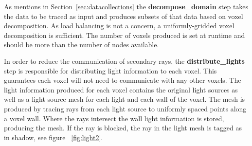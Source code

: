 As mentions in Section~\ref{sec:datacollections} the \textbf{decompose\_domain}
step takes the data to be traced as input and produces subsets of that
data based on voxel decomposition. As load balancing is not a concern,
a uniformly-gridded voxel decomposition is sufficient. The number of
voxels produced is set at runtime and should be more than the number
of nodes available.

In order to reduce the communication of secondary rays,
the \textbf{distribute\_lights} step is responsible for distributing light
information to each voxel. This guarantees each voxel will not need
to communicate with any other voxels. The light information
produced for each voxel contains the original light sources as well as
a light source mesh for each light and each wall of the voxel. The
mesh is produced by tracing rays from each light source to uniformly
spaced points along a voxel wall.  Where the rays intersect the wall light 
information is stored, producing the mesh. If the ray is blocked, the ray in 
the light mesh is tagged as in shadow, see figure ~\ref{fig:light2}.

